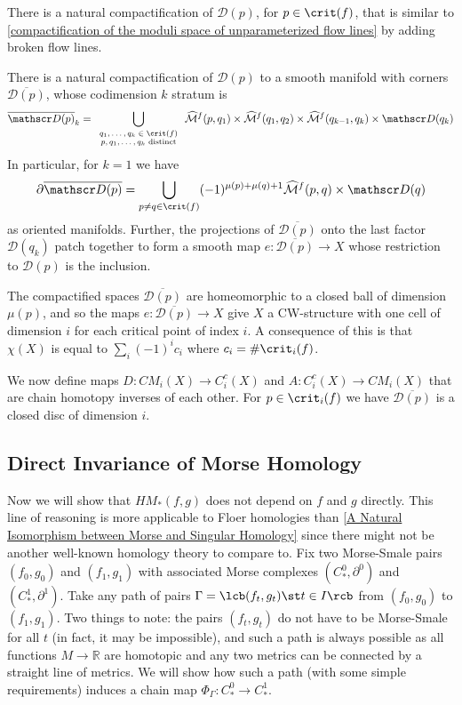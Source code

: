 There is a natural compactification of $\mathscr D(p)$, for $p \in \crit(f)$, that is similar to \cref{compactification of the moduli space of unparameterized flow lines} by adding broken flow lines.
\begin{prop}
There is a natural compactification of $\mathscr D(p)$ to a smooth manifold with corners $\overline{\mathscr D(p)}$, whose codimension $k$ stratum is
\[ \overline{\mathscr D(p)}_k = \bigcup_{\scriptsize\begin{array}{c} q_1,\ldots,q_k \in \crit(f) \\ p,q_1,\ldots,q_k \text{ distinct} \end{array}} \widehat{\mathcal M}^f(p,q_1) \times \widehat{\mathcal M}^f(q_1,q_2) \times \widehat{\mathcal M}^f(q_{k-1},q_k) \times \mathscr D(q_k) \]
In particular, for $k=1$ we have
\[ \partial\overline{\mathscr D(p)} = \bigcup_{p \neq q \in \crit(f)} (-1)^{\mu(p)+\mu(q)+1} \widehat{\mathcal M}^f(p,q) \times \mathscr D(q) \]
as oriented manifolds. Further, the projections of $\overline{\mathscr D(p)}$ onto the last factor $\mathscr D(q_k)$ patch together to form a smooth map $e : \overline{\mathscr D(p)} \rightarrow X$ whose restriction to $\mathscr D(p)$ is the inclusion.
\end{prop}

The compactified spaces $\overline{\mathscr D(p)}$ are homeomorphic to a closed ball of dimension $\mu(p)$, and so the maps $e : \overline{\mathscr D(p)} \rightarrow X$ give $X$ a CW-structure with one cell of dimension $i$ for each critical point of index $i$. A consequence of this is that $\chi(X)$ is equal to $\sum_i (-1)^i c_i$ where $c_i = \# \crit_i(f)$.

We now define maps $D : CM_i(X) \rightarrow C_i^c(X)$ and $A : C_i^c(X) \rightarrow CM_i(X)$ that are chain homotopy inverses of each other. For $p \in \crit_i(f)$ we have $\overline{\mathscr D(p)}$ is a closed disc of dimension $i$.


\unfinished




\subsection{Direct Invariance of Morse Homology}
\label{Direct Invariance of Morse Homology}


Now we will show that $HM_*(f,g)$ does not depend on $f$ and $g$ directly. This line of reasoning is more applicable to Floer homologies than \cref{A Natural Isomorphism between Morse and Singular Homology} since there might not be another well-known homology theory to compare to. Fix two Morse-Smale pairs $(f_0,g_0)$ and $(f_1,g_1)$ with associated Morse complexes $(C_*^0,\partial^0)$ and $(C_*^1,\partial^1)$. Take any path of pairs $\Gamma = \lcb (f_t,g_t) \st t \in I \rcb$ from $(f_0,g_0)$ to $(f_1,g_1)$. Two things to note: the pairs $(f_t,g_t)$ do not have to be Morse-Smale for all $t$ (in fact, it may be impossible), and such a path is always possible as all functions $M \rightarrow \mathbb R$ are homotopic and any two metrics can be connected by a straight line of metrics. We will show how such a path (with some simple requirements) induces a chain map $\Phi_\Gamma : C_*^0 \rightarrow C_*^1$. 

